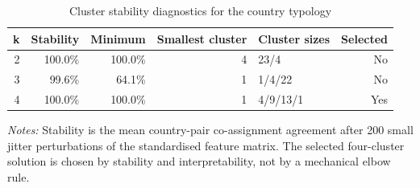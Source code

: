\begin{table}[H]
\centering
\footnotesize
\setlength{\tabcolsep}{3pt}
\caption{Cluster stability diagnostics for the country typology}
\label{tab:app_country_typology_cluster_stability}
\begin{tabular}{@{}rrrrlr@{}}
\toprule
k & Stability & Minimum & Smallest cluster & Cluster sizes & Selected \\
\midrule
2 & 100.0\% & 100.0\% & 4 & 23/4 & No \\
3 &  99.6\% &  64.1\% & 1 & 1/4/22 & No \\
4 & 100.0\% & 100.0\% & 1 & 4/9/13/1 & Yes \\
\bottomrule
\end{tabular}

\vspace{0.35em}
\noindent\begin{minipage}{\textwidth}
\footnotesize\raggedright\textit{Notes:} Stability is the mean country-pair co-assignment agreement after 200 small jitter perturbations of the standardised feature matrix. The selected four-cluster solution is chosen by stability and interpretability, not by a mechanical elbow rule.
\end{minipage}
\end{table}
